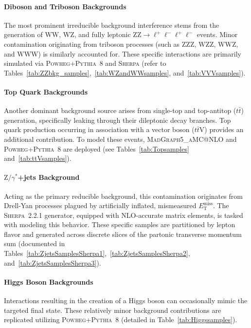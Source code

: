 \paragraph{Diboson and Triboson Backgrounds}
The most prominent irreducible background interference stems from the generation of $\text{WW}$, $\text{WZ}$, and fully leptonic $\text{ZZ} \to \ell^+\ell^-\ell^+\ell^-$ events. Minor contamination originating from triboson processes (such as $\text{ZZZ}$, $\text{WZZ}$, $\text{WWZ}$, and $\text{WWW}$) is similarly accounted for. These specific interactions are primarily simulated via \textsc{Powheg}+\textsc{Pythia}~8 and \textsc{Sherpa} (refer to Tables~\ref{tab:ZZbkg_samples},~\ref{tab:WZandWWsamples}, and~\ref{tab:VVVsamples}).

\paragraph{Top Quark Backgrounds}
Another dominant background source arises from single-top and top-antitop ($t\bar{t}$) generation, specifically leaking through their dileptonic decay branches. Top quark production occurring in association with a vector boson ($t\bar{t}\text{V}$) provides an additional contribution. To model these events, \textsc{MadGraph5\_aMC@NLO} and \textsc{Powheg}+\textsc{Pythia}~8 are deployed (see Tables~\ref{tab:Topsamples} and~\ref{tab:ttVsamples}).

\paragraph{$\text{Z}/\gamma^*$+jets Background}
Acting as the primary reducible background, this contamination originates from Drell-Yan processes plagued by artificially inflated, mismeasured $E_{\text{T}}^{\text{miss}}$. The \textsc{Sherpa}~2.2.1 generator, equipped with NLO-accurate matrix elements, is tasked with modeling this behavior. These specific samples are partitioned by lepton flavor and generated across discrete slices of the partonic transverse momentum sum (documented in Tables~\ref{tab:ZjetsSamplesSherpa1},~\ref{tab:ZjetsSamplesSherpa2}, and~\ref{tab:ZjetsSamplesSherpa3}).

\paragraph{Higgs Boson Backgrounds}
Interactions resulting in the creation of a Higgs boson can occasionally mimic the targeted final state. These relatively minor background contributions are replicated utilizing \textsc{Powheg}+\textsc{Pythia}~8 (detailed in Table~\ref{tab:Higgssamples}).


